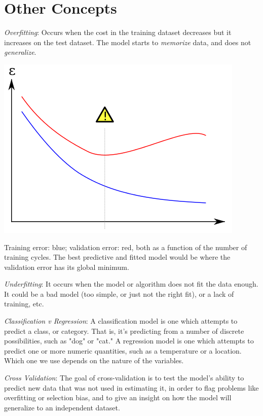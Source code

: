 
\section{Other Concepts}
\textit{Overfitting}: Occurs when the cost in the training dataset decreases but it increases on the test dataset. The model starts to \textit{memorize} data, and does not \textit{generalize}.

\includegraphics[width=\textwidth]{overfitting.png}

Training error: blue; validation error: red, both as a function of the number of training cycles. The best predictive and fitted model would be where the validation error has its global minimum.

\textit{Underfitting}: It occurs when the model or algorithm does not fit the data enough. It could be a bad model (too simple, or just not the right fit), or a lack of training, etc.

\textit{Classification v Regression}: A classification model is one which attempts to predict a class, or category. That is, it's predicting from a number of discrete possibilities, such as "dog" or "cat." A regression model is one which attempts to predict one or more numeric quantities, such as a temperature or a location. Which one we use depends on the nature of the variables.

\textit{Cross Validation}: The goal of cross-validation is to test the model's ability to predict new data that was not used in estimating it, in order to flag problems like overfitting or selection bias, and to give an insight on how the model will generalize to an independent dataset.

